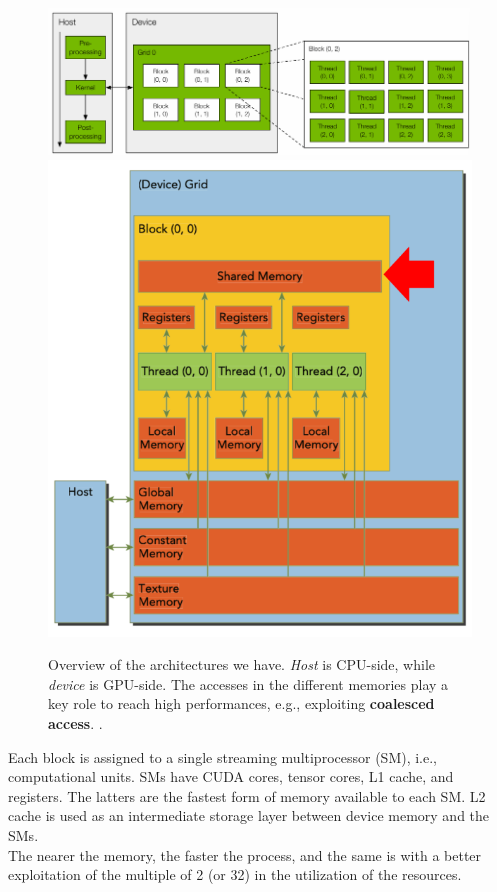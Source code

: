 \documentclass[conference]{IEEEtran}
\begin{document}
    \begin{figure}[htbp]
    	\centering
    	\includegraphics[width=\linewidth]{Immagine 2025-01-27 220907.png}
    	\includegraphics[width=0.7\linewidth]{Immagine 2025-01-28 093207.png}
    	\caption{Overview of the architectures we have. \textit{Host} is CPU-side, while \textit{device} is GPU-side. The accesses in the different memories play a key role to reach high performances, e.g., exploiting \textbf{coalesced access}. \cite{gpu101_lecture1}.}
    \end{figure}
    Each block is assigned to a single streaming multiprocessor (SM), i.e., computational units. SMs have CUDA cores, tensor cores, L1 cache, and registers. The latters are the fastest form of memory available to each SM. L2 cache is used as an intermediate storage layer between device memory and the SMs\cite{gpu101_lecture1}.\\
    The nearer the memory, the faster the process, and the same is with a better exploitation of the multiple of 2 (or 32) in the utilization of the resources.
    
\end{document}
